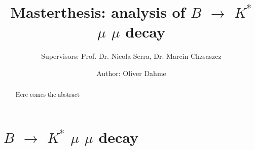 \documentclass[english]{uzhpub}
\begin{document}
\title{Masterthesis: analysis of $B$ $\rightarrow$ $K^{*}$ $\mu$ $\mu$ decay}

\subtitle{Supervisors: Prof. Dr. Nicola Serra, Dr. Marcin Chzsaszcz}

\author{Author: Oliver Dahme}


\maketitle




\begin{abstract}
 Here comes the abstract
\end{abstract}


\section{$B$ $\rightarrow$ $K^{*}$ $\mu$ $\mu$ decay}

\end{document}
